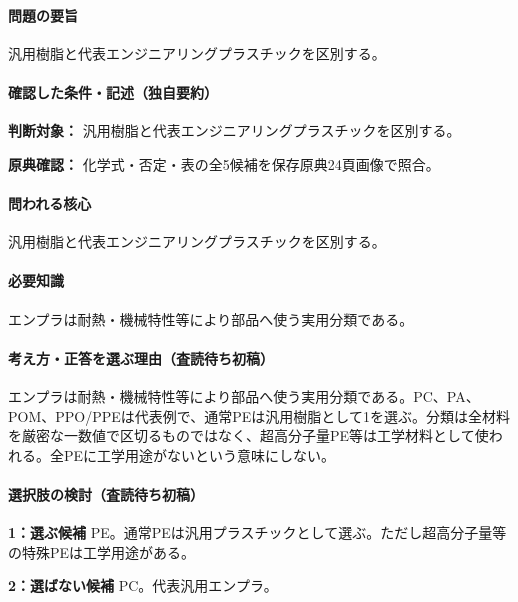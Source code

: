 \paragraph{問題の要旨} 汎用樹脂と代表エンジニアリングプラスチックを区別する。

\paragraph{確認した条件・記述（独自要約）}\mbox{}\par

\noindent\textbf{判断対象：} 汎用樹脂と代表エンジニアリングプラスチックを区別する。\par

\noindent\textbf{原典確認：} 化学式・否定・表の全5候補を保存原典24頁画像で照合。\par

\paragraph{問われる核心} 汎用樹脂と代表エンジニアリングプラスチックを区別する。

\paragraph{必要知識} エンプラは耐熱・機械特性等により部品へ使う実用分類である。

\paragraph{考え方・正答を選ぶ理由（査読待ち初稿）} エンプラは耐熱・機械特性等により部品へ使う実用分類である。PC、PA、POM、PPO/PPEは代表例で、通常PEは汎用樹脂として1を選ぶ。分類は全材料を厳密な一数値で区切るものではなく、超高分子量PE等は工学材料として使われる。全PEに工学用途がないという意味にしない。

\paragraph{選択肢の検討（査読待ち初稿）}\mbox{}\par

\noindent\textbf{1：選ぶ候補} PE。通常PEは汎用プラスチックとして選ぶ。ただし超高分子量等の特殊PEは工学用途がある。\par

\noindent\textbf{2：選ばない候補} PC。代表汎用エンプラ。\par

